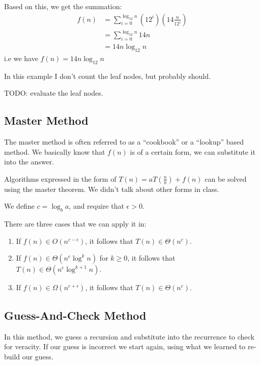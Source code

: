             Based on this, we get the summation:
            \begin{align*}
                f(n) &= \sum_{i=0}^{\log_{12}n} (12^i)(14 \frac{n}{12^i}) \\
                &= \sum_{i=0}^{\log_{12}n} 14 n \\
                &= 14 n \log_{12}n
            \end{align*}
            i.e we have $f(n) = 14 n \log_{12}n$

            In this example I don't count the leaf nodes, but probably should.

            TODO: evaluate the leaf nodes.
        \subsection{Master Method}
            The master method is often referred to as a ``cookbook'' or a
            ``lookup'' based method. We basically know that $f(n)$ is of a
            certain form, we can substitute it into the answer.

            Algorithms expressed in the form of
            $T(n) = a T\left( \frac{n}{b} \right) + f(n)$ can be solved using
            the master theorem. We didn't talk about other forms in class.

            We define $c = \log_b{a}$, and require that $\epsilon > 0$.

            There are three cases that we can apply it in:
            \begin{enumerate}
                \item If $f(n) \in O(n^{c-\epsilon})$, it follows that
                    $T(n) \in \Theta(n^c)$.
                \item If $f(n) \in \Theta(n^c \log^k n)$ for $k \ge 0$, it
                    follows that $T(n) \in \Theta(n^c \log^{k+1}n)$.
                \item If $f(n) \in \Omega(n^{c+\epsilon})$, it follows that
                    $T(n) \in \Theta(n^c)$.
             \end{enumerate}
        \subsection{Guess-And-Check Method}
            In this method, we guess a recursion and substitute into the
            recurrence to check for veracity.
            If our guess is incorrect we start again, using what we learned to
            re-build our guess.

